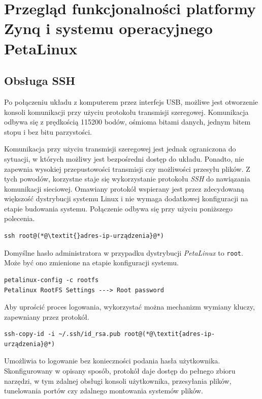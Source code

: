 \chapter{Przegląd funkcjonalności platformy Zynq i systemu operacyjnego PetaLinux}

\section{Obsługa SSH}
\label{sec:ssh}
Po połączeniu układu z komputerem przez interfejs USB, możliwe jest otworzenie konsoli komunikacji przy użyciu protokołu transmisji szeregowej. Komunikacja odbywa się z prędkością 115200 bodów, ośmioma bitami danych, jednym bitem stopu i bez bitu parzystości.

Komunikacja przy użyciu transmisji szeregowej jest jednak ograniczona do sytuacji, w których możliwy jest bezpośredni dostęp do układu. Ponadto, nie zapewnia wysokiej przepustowości transmisji czy możliwości przesyłu plików. Z tych powodów, korzystne staje się wykorzystanie protokołu \emph{SSH} do nawiązania komunikacji sieciowej.
Omawiany protokół wspierany jest przez zdecydowaną większość dystrybucji systemu Linux i nie wymaga dodatkowej konfiguracji na etapie budowania systemu. Połączenie odbywa się przy użyciu poniższego polecenia.

\begin{lstlisting}[breaklines=true]
ssh root@(*@\textit{}adres-ip-urządzenia}@*)
\end{lstlisting}

Domyślne hasło administratora w przypadku dystrybucji \emph{PetaLinux} to \texttt{root}. Może być ono zmienione na etapie konfiguracji systemu.


\begin{lstlisting}[breaklines=true]
petalinux-config -c rootfs
Petalinux RootFS Settings ---> Root password
\end{lstlisting}

Aby uprościć proces logowania, wykorzystać można mechanizm wymiany kluczy, zapewniany przez protokół.

\begin{lstlisting}[breaklines=true]
ssh-copy-id -i ~/.ssh/id_rsa.pub root@(*@\textit{adres-ip-urządzenia}@*)
\end{lstlisting}

Umożliwia to logowanie bez konieczności podania hasła użytkownika. Skonfigurowany w opisany sposób, protokół daje dostęp do pełnego zbioru narzędzi, w tym zdalnej obsługi konsoli użytkownika, przesyłania plików, tunelowania portów czy zdalnego montowania systemów plików.
